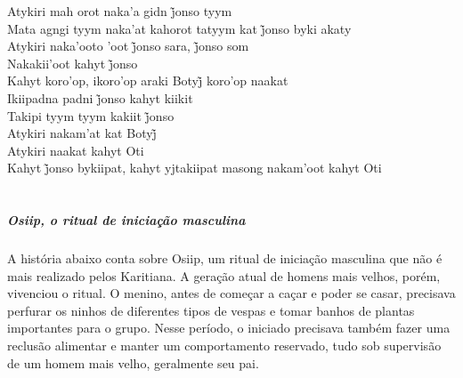 \bigskip

\begin{linenumbers}
\noindent Atykiri mah orot naka’a gidn j̃onso tyym\\
Mata agngi tyym naka’at kahorot tatyym kat j̃onso byki akaty\\
Atykiri naka’ooto ’oot j̃onso sara, j̃onso som\\
Nakakii’oot kahyt j̃onso\\
Kahyt koro’op, ikoro’op araki Botyj̃ koro’op naakat\\
Ikiipadna padni j̃onso kahyt kiikit\\
Takipi tyym tyym kakiit j̃onso\\
Atykiri nakam’at kat Botyj̃\\
Atykiri naakat kahyt Oti\\
Kahyt j̃onso bykiipat, kahyt yjtakiipat masong nakam’oot kahyt Oti
\end{linenumbers}

\chapter*{}
\thispagestyle{empty}

\vspace*{\fill}

\paragraph{Osiip, o ritual de iniciação masculina}
 A história abaixo conta sobre Osiip, um ritual de iniciação masculina que
 não é mais realizado pelos Karitiana. A geração atual de homens mais
 velhos, porém, vivenciou o ritual. O menino, antes de começar a caçar e
 poder se casar, precisava perfurar os ninhos de diferentes tipos de
 vespas e tomar banhos de plantas importantes para o grupo. Nesse
 período, o iniciado precisava também fazer uma reclusão alimentar e
 manter um comportamento reservado, tudo sob supervisão de um homem mais
 velho, geralmente seu pai.

